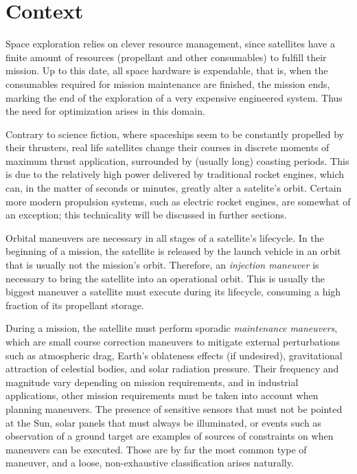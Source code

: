 \section{Context}








Space exploration relies on clever resource management, since satellites have a finite amount of resources (propellant and other consumables) to fulfill their mission. Up to this date, all space hardware is expendable, that is, when the consumables required for mission maintenance are finished, the mission ends, marking the end of the exploration of a very expensive engineered system. Thus the need for optimization arises in this domain.

Contrary to science fiction, where spaceships seem to be constantly propelled by their thrusters, real life satellites change their courses in discrete moments of maximum thrust application, surrounded by (usually long) coasting periods. This is due to the relatively high power delivered by traditional rocket engines, which can, in the matter of seconds or minutes, greatly alter a satelite's orbit. Certain more modern propulsion systems, such as electric rocket engines, are somewhat of an exception; this technicality will be discussed in further sections.

Orbital maneuvers are necessary in all stages of a satellite's lifecycle. In the beginning of a mission, the satellite is released by the launch vehicle in an orbit that is usually not the mission's orbit. Therefore, an \textit{injection maneuver} is necessary to bring the satellite into an operational orbit. This is usually the biggest maneuver a satellite must execute during its lifecycle, consuming a high fraction of its propellant storage. 

During a mission, the satellite must perform sporadic \textit{maintenance maneuvers}, which are small course correction maneuvers to mitigate external perturbations such as atmospheric drag, Earth's oblateness effects (if undesired), gravitational attraction of celestial bodies, and solar radiation pressure. Their frequency and magnitude vary depending on mission requirements, and in industrial applications, other mission requirements must be taken into account when planning maneuvers. The presence of sensitive sensors that must not be pointed at the Sun, solar panels that must always be illuminated, or events such as observation of a ground target are examples of sources of constraints on when maneuvers can be executed. Those are by far the most common type of maneuver, and a loose, non-exhaustive classification arises naturally.

